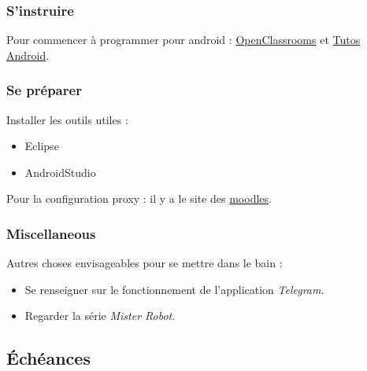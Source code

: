 \documentclass[a4paper, 11pt]{article}
\begin{document}
\subsubsection{S'instruire}

Pour commencer à programmer pour android : \href{https://openclassrooms.com/courses/creez-des-applications-pour-android/votre-premiere-application-1}{OpenClassrooms} et \href{http://www.tutos-android.com/introduction-programmation-android}{Tutos Android}.

\subsubsection{Se préparer}

Installer les outils utiles :
\begin{itemize}
	\item Eclipse
	\item AndroidStudio
\end{itemize}

Pour la configuration proxy : il y a le site des \href{https://moodle.polytechnique.fr/mod/page/view.php?id=319}{moodles}.

\subsubsection{Miscellaneous}
Autres choses envisageables pour se mettre dans le bain :
\begin{itemize}
	\item Se renseigner sur le fonctionnement de l'application \emph{Telegram}.
	\item Regarder la série \emph{Mister Robot}.
\end{itemize}

\subsection{Échéances}
\end{document}
